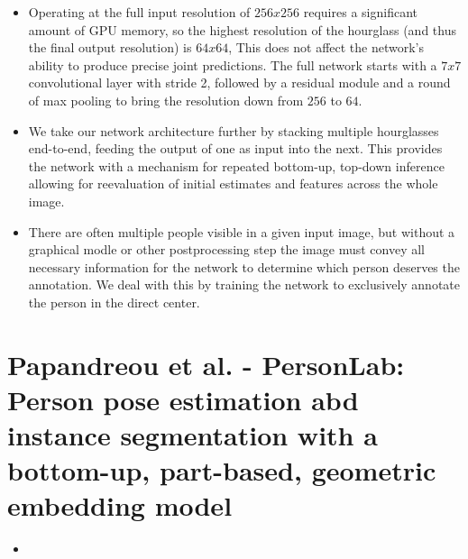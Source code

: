 \documentclass{report}
\begin{document}
\begin{itemize}
    \item Operating at the full input resolution of $256x256$ requires a significant amount of GPU memory, so the highest resolution of the hourglass (and thus the final output resolution) is $64x64$, This does not affect the network's ability to produce precise joint predictions. The full network starts with a $7x7$ convolutional layer with stride 2, followed by a residual module and a round of max pooling to bring the resolution down from $256$ to $64$. 
    \item We take our network architecture further by stacking multiple hourglasses end-to-end, feeding the output of one as input into the next. This provides the network with a mechanism for repeated bottom-up, top-down inference allowing for reevaluation of initial estimates and features across the whole image.
    \item There are often multiple people visible in a given input image, but without a graphical modle or other postprocessing step the image must convey all necessary information for the network to determine which person deserves the annotation. We deal with this by training the network to exclusively annotate the person in the direct center.
\end{itemize}

\section{Papandreou et al. - PersonLab: Person pose estimation abd instance segmentation with a bottom-up, part-based, geometric embedding model}
\begin{itemize}
    \item 
\end{itemize}
\end{document}
